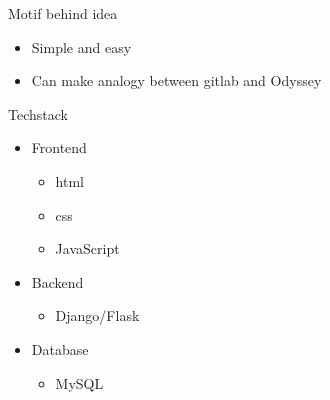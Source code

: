\documentclass[14pt]{beamer}
\begin{document}
\begin{frame}{Motif behind idea}
\begin{itemize}
    \item Simple and easy
    \item Can make analogy between gitlab and Odyssey
\end{itemize}
\end{frame}

\begin{frame}{Techstack}
\begin{itemize}
    \item Frontend
    \begin{itemize}
        \item html
        \item css
        \item JavaScript
    \end{itemize} 
    \item Backend
    \begin{itemize}
        \item Django/Flask
    \end{itemize} 
    \item Database
    \begin{itemize}
        \item MySQL
    \end{itemize}
\end{itemize}
\end{frame}
\end{document}
